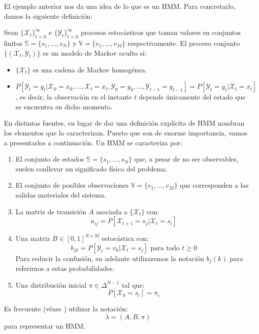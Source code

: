 El ejemplo anterior nos da una idea de lo que es un HMM. Para concretarlo, damos la siguiente definición:
\begin{definition}
    Sean $\{\mathcal{X}_t\}_{t=0}^{\infty}$ e $\{\mathcal{Y}_t\}_{t=0}^{\infty}$ procesos estocásticos que toman valores en conjuntos finitos $\mathbb{S}=\{s_1,\dots ,s_N\}$ y $\mathbb{V}=\{v_1,\dots ,v_M\}$ respectivamente. El proceso conjunto $\{\left(\mathcal{X}_t,\mathcal{Y}_t\right)\}$ es un modelo de Markov oculto si:
    \begin{itemize}
        \item $\{\mathcal{X}_t\}$ es una cadena de Markov homogénea. 
        \item $P[\mathcal{Y}_t=y_t|\mathcal{X}_0=x_0,\dots,\mathcal{X}_t=x_t,\mathcal{Y}_0=y_0,\dots,\mathcal{Y}_{t-1}=y_{t-1}]=P[\mathcal{Y}_t=y_t|\mathcal{X}_t=x_t]$, es decir, la observación en el instante $t$ depende únicamente del estado que se encuentra en dicho momento.
    \end{itemize}

\end{definition}

En distintas fuentes, en lugar de dar una definición explícita de HMM nombran los elementos que lo caracterizan. Puesto que son de enorme importancia, vamos a presentarlos a continuación. Un HMM se caracteriza por:
\begin{enumerate}
    \item El conjunto de estados $\mathbb{S}=\{s_1,\dots ,s_N\}$ que, a pesar de no ser observables, suelen conllevar un significado físico del problema.
    \item El conjunto de posibles observaciones $\mathbb{V}=\{v_1,\dots ,v_M\}$ que corresponden a las salidas materiales del sistema.
    \item La matriz de transición $A$ asociada a $\{\mathcal{X}_t\}$ con:
    \[a_{ij} = P[\mathcal{X}_{t+1}=s_j|\mathcal{X}_t=s_i]\]
    \item Una matriz $B\in\left[0,1\right]^{N\times M}$ estocástica con:
    \[b_{jk} = P[\mathcal{Y}_{t}=v_k|\mathcal{X}_t=s_j] \text{ para todo $t\geq0$}\]
    Para reducir la confusión, en adelante utilizaremos la notación $b_{j}(k)$ para referirnos a estas probabilidades.
    \item Una distribución inicial $\pi\in\Delta^{N-1}$ tal que:
    \[P[\mathcal{X}_{0}=s_i]=\pi_i\]
\end{enumerate}

Es frecuente (véase \cite{Rabiner}) utilizar la notación:
\[\lambda=\left(A,B,\pi\right)\]
para representar un HMM.

